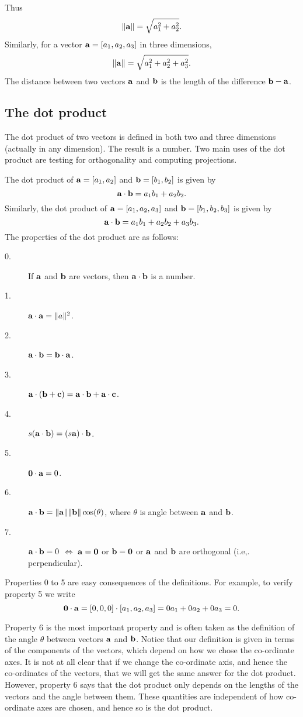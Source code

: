 Thus
\[
\|\aa\|= \sqrt{a_1^2+a_2^2}.
\]
Similarly, for a vector $\aa=[a_1,a_2,a_3]$ in three dimensions,
\[
\|\aa\|= \sqrt{a_1^2+a_2^2+a_3^2}.
\]
The distance between two vectors $\aa$ and $\bb$ is the length of the
difference $\bb-\aa$.

\subsection{The dot product}

The dot product of two vectors is defined in both two and three
dimensions (actually in any dimension). The result is a number. Two
main uses of the dot product are testing for orthogonality and
computing projections.

The dot product of $\aa=[a_1,a_2]$ and $\bb=[b_1,b_2]$ is given by
\[
\aa\cdot\bb = a_1b_1 + a_2b_2.
\]
Similarly, the dot product of $\aa=[a_1,a_2,a_3]$ and
$\bb=[b_1,b_2,b_3]$ is given by
\[
\aa\cdot\bb = a_1b_1 + a_2b_2 + a_3b_3.
\]
The properties of the dot product are as follows:
\begin{description}
\item[0.] If $\aa$ and $\bb$ are vectors, then $\aa\cdot\bb$ is a number.
\item[1.] $\aa\cdot\aa = \|a\|^2$.
\item[2.] $\aa\cdot\bb = \bb\cdot\aa$.
\item[3.] $\aa\cdot(\bb+\cc) = \aa\cdot\bb + \aa\cdot\cc$.
\item[4.] $s(\aa\cdot\bb) = (s\aa)\cdot\bb$.
\item[5.] $\zv\cdot\aa=0$.
\item[6.] $\aa\cdot\bb = \|\aa\|\|\bb\|\cos(\theta)$, where $\theta$
is angle between $\aa$ and $\bb$.  
\item[7.] $\aa\cdot\bb = 0$ $\iff$ $\aa=\zv$ or $\bb=\zv$ or $\aa$ and
$\bb$ are orthogonal (i.e,. perpendicular).
\end{description}
Properties 0 to 5 are easy consequences of the definitions. 
For example, to
verify property 5 we write
\[
\zv\cdot\aa = [0,0,0]\cdot[a_1,a_2,a_3]= 0a_1+0a_2+0a_3=0.
\]

Property 6 is the most important property and is often taken as the
definition of the angle $\theta$ between vectors $\bf a$ and $\bf b$.  
Notice that our definition is given in terms of the
components of the vectors, which depend on how we chose the
co-ordinate axes. It is not at all clear that if we change the
co-ordinate axis, and hence the co-ordinates of the vectors, that we
will get the same answer for the dot product. However, property 6 says
that the dot product only depends on the lengths of the vectors and
the angle between them. These quantities are independent of how
co-ordinate axes are chosen, and hence so is the dot product.

